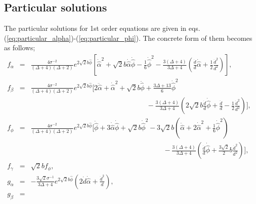 \documentclass[a4paper,11pt]{article}
\begin{document}
\subsection{Particular solutions}

The particular solutions for 1st order equations are given in 
eqs.(\ref{eq:particular_alpha})-(\ref{eq:particular_phi}). 
The concrete form of them becomes as follows;
\begin{eqnarray}
f_{\alpha} &=& 
\frac{4\sigma^{-2}}{(\Delta +4)(\Delta +2)} e^{2\sqrt{2}b\hat{\phi}}
\left[
\dot{\hat{\alpha}}^2 +\sqrt{2}b\dot{\hat{\alpha}}\dot{\hat{\phi}}
-\frac{1}{6}\dot{\hat{{\phi}}}^2 
-\frac{3(\Delta +4)}{3\Delta +4}
 \left(
 \frac{\dot{d}}{d}\dot{\hat{\alpha}}+\frac{1}{2}\frac{\dot{d}^2}{d^2} 
 \right)
\right], \\
f_{\beta} &=& 
\frac{4\sigma^{-2}}{(\Delta +4)(\Delta +2)} e^{2\sqrt{2}b\hat{\phi}}
\Bigg[
2\ddot{\hat{\alpha}}+\dot{\hat{\alpha}}^2 
+\sqrt{2}b \ddot{\hat{\phi}}
+\frac{3\Delta +13}{6}\dot{\hat{{\phi}}}^2 \nonumber \\
& &\hspace{7cm}-\frac{3(\Delta +4)}{3\Delta +4}
 \left(
 2\sqrt{2}b\frac{\dot{d}}{d}\dot{\hat{\phi}}
 +\frac{\ddot{d}}{d}
-\frac{1}{2}\frac{\dot{d}^2}{d^2} 
 \right)
\Bigg], \\
f_{\phi} &=& 
\frac{4\sigma^{-2}}{(\Delta +4)(\Delta +2)} e^{2\sqrt{2}b\hat{\phi}}
\Bigg[
\ddot{\hat{\phi}} +3\dot{\hat{\alpha}}\dot{\hat{\phi}}
+\sqrt{2}b\dot{\hat{\phi}}^2
-3\sqrt{2}b
\left(
\ddot{\hat{\alpha}}
+2\dot{\hat{\alpha}}^2
+\frac{1}{6}\dot{\hat{\phi}}^2
\right) \nonumber \\ 
& &\hspace{8cm}-\frac{3(\Delta +4)}{3\Delta +4}
\left(
 \frac{\dot{d}}{d}\dot{\hat{\phi}}
 +\frac{3\sqrt{2}}{2}b\frac{\dot{d}^2}{d^2} 
 \right)
\Bigg],  \\
f_{\gamma} &=& \sqrt{2}bf_{\phi}, \\
g_{\alpha} &=& 
-\frac{3\sqrt{2}\sigma^{-1}}{3\Delta +4} e^{2\sqrt{2}b\hat{\phi}} 
\left(
2\dot{d}\dot{\hat{\alpha}} +\frac{\dot{d}^2}{d} 
\right),   \\
g_{\beta} &=& 

\end{eqnarray}
\end{document}
